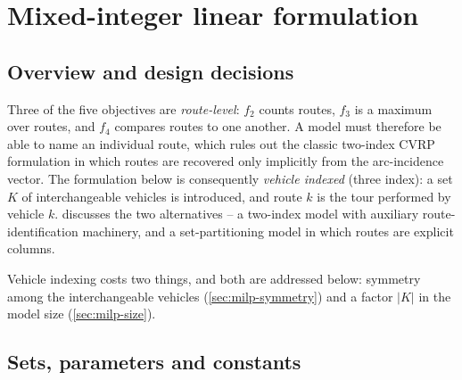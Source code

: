 \documentclass[11pt,a4paper]{article}
\theoremstyle{definition}
\theoremstyle{plain}
\newcommand{\Veh}{K}
\begin{document}
\section{Mixed-integer linear formulation}
\label{sec:milp}

\subsection{Overview and design decisions}

Three of the five objectives are \emph{route-level}: $f_2$ counts routes, $f_3$
is a maximum over routes, and $f_4$ compares routes to one another.  A model
must therefore be able to name an individual route, which rules out the classic
two-index CVRP formulation in which routes are recovered only implicitly from
the arc-incidence vector.  The formulation below is consequently
\emph{vehicle indexed} (three index): a set $\Veh$ of interchangeable vehicles
is introduced, and route $k$ is the tour performed by vehicle $k$.
 discusses the two alternatives -- a two-index model
with auxiliary route-identification machinery, and a set-partitioning model in
which routes are explicit columns.

Vehicle indexing costs two things, and both are addressed below: symmetry
among the interchangeable vehicles (\cref{sec:milp-symmetry}) and a factor
$|\Veh|$ in the model size (\cref{sec:milp-size}).

\subsection{Sets, parameters and constants}
\label{sec:milp-data}
\end{document}
